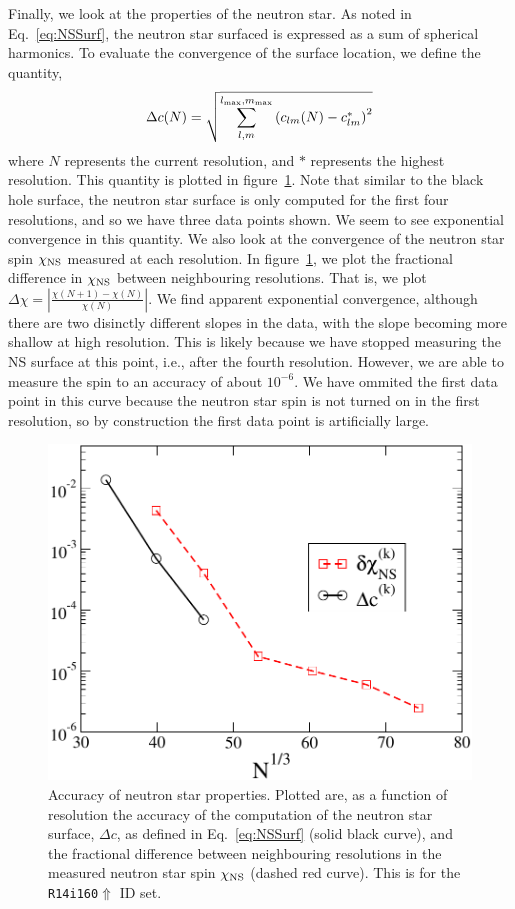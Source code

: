 Finally, we look at the properties of the neutron star. As noted in Eq.~\ref{eq:NSSurf},
the neutron star surfaced is expressed as a sum of spherical
harmonics.
To evaluate the convergence of the surface location, we define the
quantity,
\begin{equation}
\label{eq:NSSurf}
\Delta c(N)=\sqrt{\sum_{l,m}^{l_{\rm max},m_{\rm max}}\left(c_{lm}(N)-c^{*}_{lm}\right)^2}
\end{equation}
where $N$ represents the current resolution, and $*$ represents the
highest resolution. This quantity is plotted in
figure~\ref{fig:SpinDiff}. Note that similar to the black hole surface, the
neutron star surface is only computed for the first four resolutions,
and so we have three data points shown. We seem to see exponential
convergence in this quantity. We also look at the convergence of the
neutron star spin $\chi_{\rm NS}$ measured at each resolution. In
figure~\ref{fig:SpinDiff}, we plot the fractional difference in
$\chi_{\rm NS}$ between neighbouring resolutions. That is, we plot
$
\Delta\chi=|\frac{\chi(N+1)-\chi(N)}{\chi(N)}|.
$
 We find apparent
exponential convergence, although there are two disinctly different
slopes in the data, with the slope becoming more shallow at high
resolution. This is likely because we have stopped measuring the NS
surface at this point, i.e., after the fourth resolution. However, we are able to measure the spin to an
accuracy of about $10^{-6}$. 
 We have ommited the first data point in this curve
because the neutron star spin is not turned on in the first
resolution, so by construction the first data point is artificially large.

\begin{figure}
\includegraphics[width=0.95\columnwidth]{chap4/SpinDiff}
\caption[Neutron star surface and spin accuracy.]{\label{fig:SpinDiff}
  Accuracy of neutron star properties. Plotted are, as a function of resolution the accuracy of the computation of the neutron star
  surface, $\Delta c$, as defined in Eq.~\ref{eq:NSSurf} (solid black
  curve), and the fractional difference between neighbouring
  resolutions in the measured neutron star spin $\chi_{\rm NS}$ (dashed red
  curve). This is for the {\tt R14i160$\Uparrow$} ID set.}
\end{figure}

